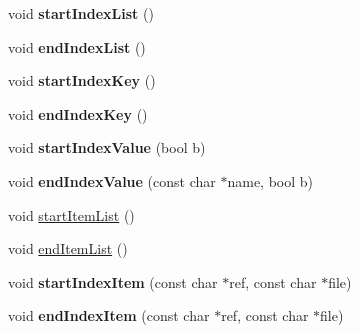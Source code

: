 \begin{DoxyCompactItemize}
\item 
\hypertarget{class_output_list_a9b31ceb5ba1248cb820bad23a8c6624a}{void {\bfseries start\-Index\-List} ()}\label{class_output_list_a9b31ceb5ba1248cb820bad23a8c6624a}

\item 
\hypertarget{class_output_list_a38fc8c258fcd3d6196e12c1a51018c9a}{void {\bfseries end\-Index\-List} ()}\label{class_output_list_a38fc8c258fcd3d6196e12c1a51018c9a}

\item 
\hypertarget{class_output_list_a35efacde67c233f22b5a11becdaaaa13}{void {\bfseries start\-Index\-Key} ()}\label{class_output_list_a35efacde67c233f22b5a11becdaaaa13}

\item 
\hypertarget{class_output_list_a22c9a476a4b39fc3cffecf763b39b05c}{void {\bfseries end\-Index\-Key} ()}\label{class_output_list_a22c9a476a4b39fc3cffecf763b39b05c}

\item 
\hypertarget{class_output_list_a0e2219f3dc9f2eae72b2a55db6e45405}{void {\bfseries start\-Index\-Value} (bool b)}\label{class_output_list_a0e2219f3dc9f2eae72b2a55db6e45405}

\item 
\hypertarget{class_output_list_a28c8ce454459964df73fdcc19ece1f37}{void {\bfseries end\-Index\-Value} (const char $\ast$name, bool b)}\label{class_output_list_a28c8ce454459964df73fdcc19ece1f37}

\item 
void \hyperlink{class_output_list_af2a17ac8deb6919dda56ae5107ea1529}{start\-Item\-List} ()
\item 
void \hyperlink{class_output_list_ab11dc69249cdab99802fe788b9da43d5}{end\-Item\-List} ()
\item 
\hypertarget{class_output_list_ad7ab1d36b425503e9dd9656ca85ec6db}{void {\bfseries start\-Index\-Item} (const char $\ast$ref, const char $\ast$file)}\label{class_output_list_ad7ab1d36b425503e9dd9656ca85ec6db}

\item 
\hypertarget{class_output_list_a05f165444ace049ae9353f93a55da1c6}{void {\bfseries end\-Index\-Item} (const char $\ast$ref, const char $\ast$file)}\label{class_output_list_a05f165444ace049ae9353f93a55da1c6}


\end{DoxyCompactItemize}
